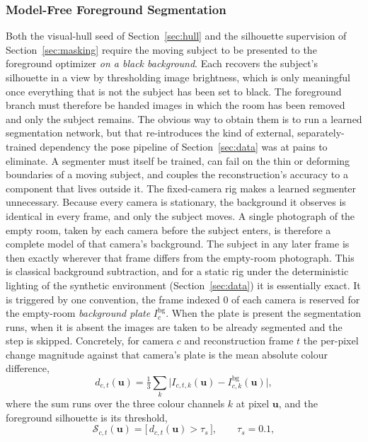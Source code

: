 \subsubsection{Model-Free Foreground Segmentation}
\label{sec:bgsub}

Both the visual-hull seed of Section~\ref{sec:hull} and the silhouette supervision of
Section~\ref{sec:masking} require the moving subject to be presented to the foreground
optimizer \emph{on a black background}. Each recovers the subject's silhouette in a view by
thresholding image brightness, which is only meaningful once everything that is not
the subject has been set to black. The foreground branch must therefore be handed images in
which the room has been removed and only the subject remains. The obvious way to obtain them
is to run a learned segmentation network, but that re-introduces the kind of
external, separately-trained dependency the pose pipeline of Section~\ref{sec:data} was at
pains to eliminate. A segmenter must itself be trained, can fail on the thin or deforming
boundaries of a moving subject, and couples the reconstruction's accuracy to a component
that lives outside it. The fixed-camera rig makes a learned segmenter unnecessary. Because every camera is
stationary, the background it observes is identical in every frame, and only the
subject moves. A single photograph of the empty room, taken by each camera before the
subject enters, is therefore a complete model of that camera's background. The subject in
any later frame is then exactly wherever that frame differs from the empty-room photograph.
This is classical background subtraction, and for a static rig under the deterministic
lighting of the synthetic environment (Section~\ref{sec:data}) it is essentially exact. It is
triggered by one convention, the frame indexed $0$ of each camera is reserved for the
empty-room \emph{background plate} $I^{\mathrm{bg}}_c$. When the plate is present the
segmentation runs, when it is absent the images are taken to be already segmented and the step is skipped. Concretely, for camera $c$ and reconstruction frame $t$ the per-pixel change magnitude
against that camera's plate is the mean absolute colour difference,
\begin{equation}
    d_{c,t}(\mathbf{u}) = \tfrac{1}{3}\textstyle\sum_{k} \big| I_{c,t,k}(\mathbf{u}) - I^{\mathrm{bg}}_{c,k}(\mathbf{u}) \big|,
\end{equation}
where the sum runs over the three colour channels $k$ at pixel $\mathbf{u}$, and the
foreground silhouette is its threshold,
\begin{equation}
    \mathcal{S}_{c,t}(\mathbf{u}) = \big[\, d_{c,t}(\mathbf{u}) > \tau_s \,\big],
    \qquad \tau_s = 0.1,
    \label{eq:bgsub}
\end{equation}
